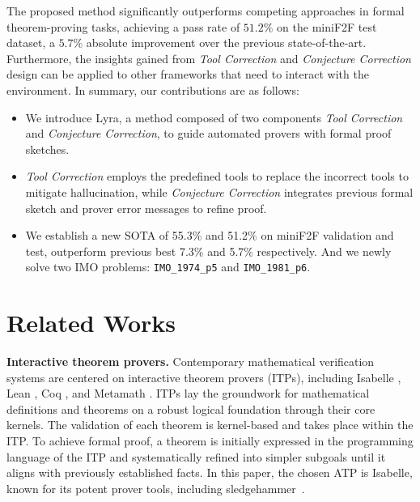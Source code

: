 \documentclass{article} \usepackage{iclr2024_conference,times}
\def\methodOneFull{\textit{Tool Correction}\xspace}
\def\methodTwoFull{\textit{Conjecture Correction}\xspace}
\def\fullname{Lyra\xspace}
\begin{document}
The proposed method significantly outperforms competing approaches in formal theorem-proving tasks, achieving a pass rate of $51.2\%$ on the miniF2F test dataset, a $5.7\%$ absolute improvement over the previous state-of-the-art. Furthermore, the insights gained from \methodOneFull and \methodTwoFull design can be applied to other frameworks that need to interact with the environment. In summary, our contributions are as follows:
\begin{itemize}[itemsep=5pt,topsep=0pt,parsep=0pt]
  \item We introduce \fullname, a method composed of two components \methodOneFull and \methodTwoFull, to guide automated provers with formal proof sketches.
  \item \methodOneFull employs the predefined
tools to replace the incorrect tools to mitigate hallucination, while \methodTwoFull integrates previous formal sketch and prover error messages to refine proof.
  \item We establish a new SOTA of 55.3\% and 51.2\% on miniF2F validation and test, outperform previous best 7.3\% and 5.7\% respectively. And we newly solve two IMO problems: \texttt{IMO\_1974\_p5} and \texttt{IMO\_1981\_p6}.
\end{itemize}


\section{Related Works}
\textbf{Interactive theorem provers.} 
Contemporary mathematical verification systems are centered on interactive theorem provers (ITPs), including Isabelle \citep{paulson1994isabelle}, Lean \citep{de2015lean}, Coq \citep{barras1997coq}, and Metamath \citep{megill2019computer}. ITPs lay the groundwork for mathematical definitions and theorems on a robust logical foundation through their core kernels. The validation of each theorem is kernel-based and takes place within the ITP. To achieve formal proof, a theorem is initially expressed in the programming language of the ITP and systematically refined into simpler subgoals until it aligns with previously established facts. In this paper, the chosen ATP is Isabelle, known for its potent prover tools, including sledgehammer~\citep{paulson2010three}.
\end{document}
